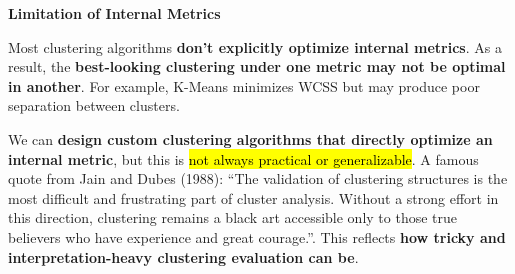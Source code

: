 \newpage

\begin{flushleft}
    \textcolor{Red2}{ \textbf{Limitation of Internal Metrics}}
\end{flushleft}
Most clustering algorithms \textbf{don't explicitly optimize internal metrics}. As a result, the \textbf{best-looking clustering under one metric may not be optimal in another}. For example, K-Means minimizes WCSS but may produce poor separation between clusters.

\highspace
We can \textbf{design custom clustering algorithms that directly optimize an internal metric}, but this is \hl{not always practical or generalizable}. A famous quote from Jain and Dubes (1988): ``The validation of clustering structures is the most difficult and frustrating part of cluster analysis. Without a strong effort in this direction, clustering remains a black art accessible only to those true believers who have experience and great courage.''. This reflects \textbf{how tricky and interpretation-heavy clustering evaluation can be}.